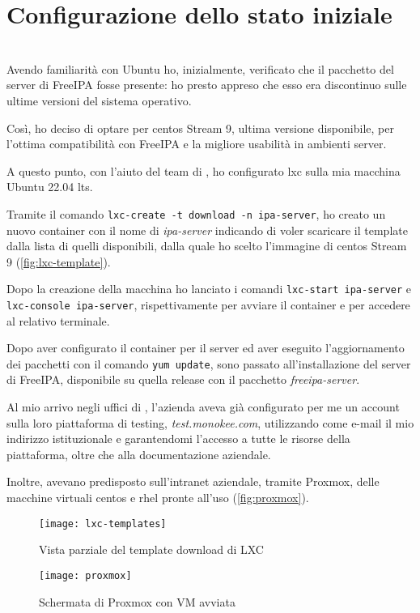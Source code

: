 
\chapter{Configurazione dello stato iniziale}
\label{cap:configurazione-stato-iniziale}

\\

Avendo familiarità con Ubuntu ho, inizialmente, verificato che il pacchetto del server di FreeIPA fosse presente: ho presto appreso che esso era discontinuo sulle ultime versioni del sistema operativo.

Così, ho deciso di optare per \acrshort{centos} Stream 9, ultima versione disponibile, per l'ottima compatibilità con FreeIPA e la migliore usabilità in ambienti server.

A questo punto, con l'aiuto del team di \myAzienda, ho configurato \acrshort{lxc} sulla mia macchina Ubuntu 22.04 \acrfull{lts}.

Tramite il comando \texttt{lxc-create -t download -n ipa-server}, ho creato un nuovo container con il nome di \emph{ipa-server} indicando di voler scaricare il template dalla lista di quelli disponibili, dalla quale ho scelto l'immagine di \acrshort{centos} Stream 9 (\autoref{fig:lxc-template}).

Dopo la creazione della macchina ho lanciato i comandi \texttt{lxc-start ipa-server} e \texttt{lxc-console ipa-server}, rispettivamente per avviare il container e per accedere al relativo terminale.


Dopo aver configurato il container per il server ed aver eseguito l'aggiornamento dei pacchetti con il comando \texttt{yum update}, sono passato all'installazione del server di FreeIPA, disponibile su quella release con il pacchetto \emph{freeipa-server}.


Al mio arrivo negli uffici di \myAzienda, l'azienda aveva già configurato per me un account sulla loro piattaforma di testing, \emph{test.monokee.com}, utilizzando come e-mail il mio indirizzo istituzionale e garantendomi l'accesso a tutte le risorse della piattaforma, oltre che alla documentazione aziendale.

Inoltre, avevano predisposto sull'intranet aziendale, tramite Proxmox, delle macchine virtuali \acrshort{centos} e \acrshort{rhel} pronte all'uso (\autoref{fig:proxmox}).

\begin{figure}[H] 
    \centering 
    \texttt{[image: lxc-templates]} 
    \caption{Vista parziale del template download di LXC}
    \label{fig:lxc-template}
\end{figure}

\begin{figure}[H] 
    \centering 
    \texttt{[image: proxmox]} 
    \caption{Schermata di Proxmox con VM avviata}
    \label{fig:proxmox}
\end{figure}